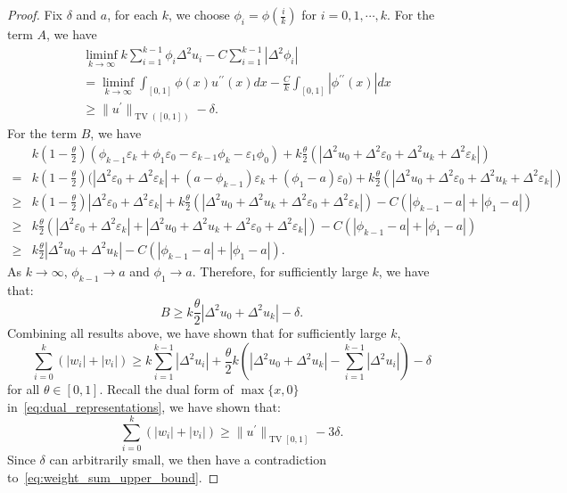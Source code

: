 \documentclass[12pt]{amsart}
\numberwithin{equation}{section}
\theoremstyle{remark}
\begin{document}
\begin{proof}
Fix $\delta$ and $a$, for each $k$, we choose $\phi_i = \phi(\frac i k)$ for $i=0,1,\cdots, k$. For the term $A$, we have
\begin{equation}
    \label{eq:main_term_estimate}
\begin{aligned}
    &\liminf_{k\to \infty}  k\sum_{i=1}^{k-1} \phi_i\Delta^2 u_i- C\sum_{i=1}^{k-1} |\Delta^2\phi_i| \\
    &=\liminf_{k\to \infty} \int_{[0,1]} \phi(x) u^{\prime\prime}(x)dx - \frac{C}{k}\int_{[0,1]} |\phi^{\prime\prime}(x)|dx\\
    & \ge \|u^\prime\|_{\operatorname{TV}([0,1])} -\delta.
\end{aligned}
\end{equation}
For the term $B$, we have
\begin{equation}
    \label{eq:remaining_term}
    \begin{aligned}
            &k(1-\frac \theta 2)(\phi_{k-1} \varepsilon_k+\phi_1 \varepsilon_0-\varepsilon_{k-1}\phi_k-\varepsilon_1\phi_0)+k\frac{\theta}{2}(|\Delta^2 u_0+\Delta^2 \varepsilon_0 + \Delta^2 u_k+\Delta^2 \varepsilon_k|)\\
            = & k(1-\frac \theta 2)\bigl(|\Delta^2 \varepsilon_0+\Delta^2\varepsilon_k|+ (a-\phi_{k-1})\varepsilon_k+(\phi_1-a)\varepsilon_0 \bigr)+k\frac{\theta}{2}(|\Delta^2 u_0+\Delta^2 \varepsilon_0 + \Delta^2 u_k+\Delta^2 \varepsilon_k|)\\
            \ge  & k(1-\frac \theta 2)|\Delta^2 \varepsilon_0+\Delta^2\varepsilon_k|+k\frac{\theta}{2}(|\Delta^2 u_0+ \Delta^2 u_k+\Delta^2 \varepsilon_0 +\Delta^2 \varepsilon_k|) - C(|\phi_{k-1}-a|+|\phi_1-a|)\\
            \ge & k\frac{\theta}{2}(|\Delta^2 \varepsilon_0+\Delta^2\varepsilon_k|+|\Delta^2 u_0+ \Delta^2 u_k+\Delta^2 \varepsilon_0 +\Delta^2 \varepsilon_k|)- C(|\phi_{k-1}-a|+|\phi_1-a|)\\
            \ge & k\frac \theta 2 |\Delta^2 u_0+\Delta^2 u_k|-C(|\phi_{k-1}-a|+|\phi_1-a|).
    \end{aligned}
\end{equation}
As $k\to \infty$, $\phi_{k-1}\to a$ and $\phi_1\to a$. Therefore, for sufficiently large $k$, we have that:
\begin{equation}
B \ge k\frac \theta 2 |\Delta^2 u_0+\Delta^2 u_k|-\delta.
\end{equation}
Combining all results above, we have shown that for sufficiently large $k$,
\begin{equation}
    \sum_{i=0}^k \left(|w_i|+|v_i|\right)\ge k\sum_{i=1}^{k-1} |\Delta^2 u_i|+ \frac \theta 2 k\left( |\Delta^2 u_0 + \Delta^2 u_k|-\sum_{i=1}^{k-1} |\Delta^2 u_i|\right)-\delta
\end{equation}
for all $\theta\in [0,1]$. Recall the dual form of $\max\{x, 0\}$ in~\eqref{eq:dual_representations},
we have shown that:
\begin{equation}
    \sum_{i=0}^k \left(|w_i|+|v_i|\right)\ge \|{u^\prime}\|_{\operatorname{TV}[0,1]} -3\delta.
\end{equation}
Since $\delta$ can arbitrarily small,  we then have a contradiction to~\eqref{eq:weight_sum_upper_bound}.
\end{proof}
\end{document}
